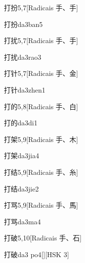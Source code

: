 \begin{entry}{打扮}{5,7}[Radicais ⼿、⼿]
  \begin{phonetics}{打扮}{da3ban5}
  \end{phonetics}
\end{entry}

\begin{entry}{打扰}{5,7}[Radicais ⼿、⼿]
  \begin{phonetics}{打扰}{da3rao3}
  \end{phonetics}
\end{entry}

\begin{entry}{打针}{5,7}[Radicais ⼿、⾦]
  \begin{phonetics}{打针}{da3zhen1}
  \end{phonetics}
\end{entry}

\begin{entry}{打的}{5,8}[Radicais ⼿、⽩]
  \begin{phonetics}{打的}{da3di1}
  \end{phonetics}
\end{entry}

\begin{entry}{打架}{5,9}[Radicais ⼿、⽊]
  \begin{phonetics}{打架}{da3jia4}
  \end{phonetics}
\end{entry}

\begin{entry}{打结}{5,9}[Radicais ⼿、⽷]
  \begin{phonetics}{打结}{da3jie2}
  \end{phonetics}
\end{entry}

\begin{entry}{打骂}{5,9}[Radicais ⼿、⾺]
  \begin{phonetics}{打骂}{da3ma4}
  \end{phonetics}
\end{entry}

\begin{entry}{打破}{5,10}[Radicais ⼿、⽯]
  \begin{phonetics}{打破}{da3 po4}[][HSK 3]
  \end{phonetics}
\end{entry}

